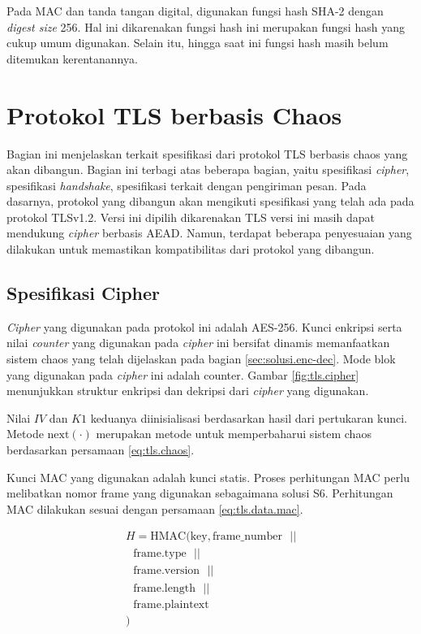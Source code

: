 Pada MAC dan tanda tangan digital, digunakan fungsi hash SHA-2 dengan \emph{digest size} 256. Hal ini dikarenakan fungsi hash ini merupakan fungsi hash yang cukup umum digunakan. Selain itu, hingga saat ini fungsi hash masih belum ditemukan kerentanannya.

\section{Protokol TLS berbasis Chaos} \label{sec:protokol-tls-chaos}

Bagian ini menjelaskan terkait spesifikasi dari protokol TLS berbasis chaos yang akan dibangun. Bagian ini terbagi atas beberapa bagian, yaitu spesifikasi \emph{cipher}, spesifikasi \emph{handshake}, spesifikasi terkait dengan pengiriman pesan. Pada dasarnya, protokol yang dibangun akan mengikuti spesifikasi yang telah ada pada protokol TLSv1.2. Versi ini dipilih dikarenakan TLS versi ini masih dapat mendukung \emph{cipher} berbasis AEAD. Namun, terdapat beberapa penyesuaian yang dilakukan untuk memastikan kompatibilitas dari protokol yang dibangun.

\subsection{Spesifikasi Cipher}

\emph{Cipher} yang digunakan pada protokol ini adalah AES-256. Kunci enkripsi serta nilai \emph{counter} yang digunakan pada \emph{cipher} ini bersifat dinamis memanfaatkan sistem chaos yang telah dijelaskan pada bagian \ref{sec:solusi.enc-dec}. Mode blok yang digunakan pada \emph{cipher} ini adalah counter. Gambar \ref{fig:tls.cipher} menunjukkan struktur enkripsi dan dekripsi dari \emph{cipher} yang digunakan.

Nilai $IV$ dan $K1$ keduanya diinisialisasi berdasarkan hasil dari pertukaran kunci. Metode $\text{next}(\cdot)$ merupakan metode untuk memperbaharui sistem chaos berdasarkan persamaan \ref{eq:tls.chaos}.

Kunci MAC yang digunakan adalah kunci statis. Proses perhitungan MAC perlu melibatkan nomor frame yang digunakan sebagaimana solusi S6. Perhitungan MAC dilakukan sesuai dengan persamaan \ref{eq:tls.data.mac}.

\begin{equation}
  \label{eq:tls.data.mac}
  \begin{array}{l}
    H = \text{HMAC}(\text{key}, \text{frame\_number}\text{ }|| \\ 
      \text{   }\text{frame}.\text{type}\text{ }|| \\
      \text{   }\text{frame}.\text{version}\text{ }|| \\ 
      \text{   }\text{frame}.\text{length}\text{ }|| \\
      \text{   }\text{frame}.\text{plaintext} \\
    ) 
  \end{array}
\end{equation}

